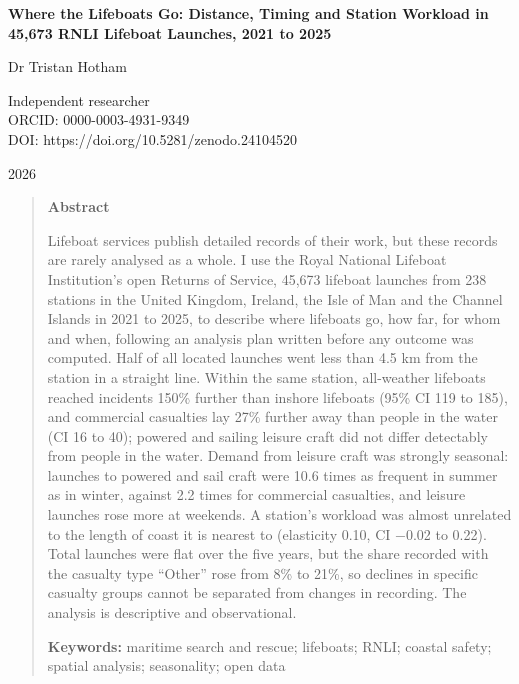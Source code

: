 \documentclass[11pt,a4paper]{article}
\begin{document}
\begin{center}
{\Large\bfseries Where the Lifeboats Go: Distance, Timing and Station Workload in 45,673 RNLI Lifeboat Launches, 2021 to 2025\par}
\vspace{1.2em}
{\large Dr Tristan Hotham\par}
\vspace{0.3em}
{\small Independent researcher\\
ORCID: 0000-0003-4931-9349\\
DOI: https://doi.org/10.5281/zenodo.24104520\par}
\vspace{0.8em}
2026
\end{center}

\begin{quote}
\small
\begin{center}\textbf{Abstract}\end{center}
Lifeboat services publish detailed records of their work, but these records are rarely analysed as a whole. I use the Royal National Lifeboat Institution's open Returns of Service, 45,673 lifeboat launches from 238 stations in the United Kingdom, Ireland, the Isle of Man and the Channel Islands in 2021 to 2025, to describe where lifeboats go, how far, for whom and when, following an analysis plan written before any outcome was computed. Half of all located launches went less than 4.5 km from the station in a straight line. Within the same station, all-weather lifeboats reached incidents 150\% further than inshore lifeboats (95\% CI 119 to 185), and commercial casualties lay 27\% further away than people in the water (CI 16 to 40); powered and sailing leisure craft did not differ detectably from people in the water. Demand from leisure craft was strongly seasonal: launches to powered and sail craft were 10.6 times as frequent in summer as in winter, against 2.2 times for commercial casualties, and leisure launches rose more at weekends. A station's workload was almost unrelated to the length of coast it is nearest to (elasticity 0.10, CI $-$0.02 to 0.22). Total launches were flat over the five years, but the share recorded with the casualty type ``Other'' rose from 8\% to 21\%, so declines in specific casualty groups cannot be separated from changes in recording. The analysis is descriptive and observational.

\textbf{Keywords:} maritime search and rescue; lifeboats; RNLI; coastal safety; spatial analysis; seasonality; open data
\end{quote}
\end{document}
